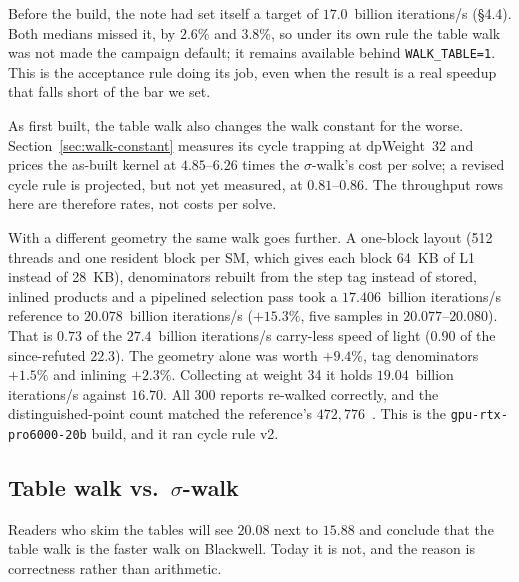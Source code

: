 Before the build, the note had set itself a target of $17.0$~billion iterations/s
(§4.4). Both medians missed it, by $2.6\%$ and $3.8\%$, so under its
own rule the table walk was not made the campaign default; it remains
available behind \texttt{WALK\_TABLE=1}. This is the acceptance rule
doing its job, even when the result is a real speedup that falls short
of the bar we set.

As first built, the table walk also changes the walk constant for the
worse. Section~\ref{sec:walk-constant} measures its cycle trapping at
dpWeight~32 and prices the as-built kernel at $4.85$--$6.26$ times the
$\sigma$-walk's cost per solve; a revised cycle rule is projected, but
not yet measured, at $0.81$--$0.86$. The throughput rows here are
therefore rates, not costs per solve.

With a different geometry the same walk goes further. A one-block
layout (512 threads and one resident block per SM, which gives each
block 64~KB of L1 instead of 28~KB), denominators rebuilt from the step
tag instead of stored, inlined products and a pipelined selection pass
took a $17.406$~billion iterations/s reference to $20.078$~billion iterations/s ($+15.3\%$, five samples
in $20.077$--$20.080$). That is $0.73$ of the $27.4$~billion iterations/s carry-less
speed of light ($0.90$ of the since-refuted $22.3$). The geometry alone
was worth $+9.4\%$, tag denominators $+1.5\%$ and inlining $+2.3\%$.
Collecting at weight 34 it holds $19.04$~billion iterations/s against $16.70$. All 300
reports re-walked correctly, and the distinguished-point count matched
the reference's $472{,}776$~. This is
the \texttt{gpu-rtx-pro6000-20b} build, and it ran cycle rule v2.

\subsection{Table walk vs.\ $\sigma$-walk}
\label{sec:sigma-vs-table}



Readers who skim the tables will see $20.08$ next to $15.88$ and
conclude that the table walk is the faster walk on Blackwell. Today
it is not, and the reason is correctness rather than arithmetic.

